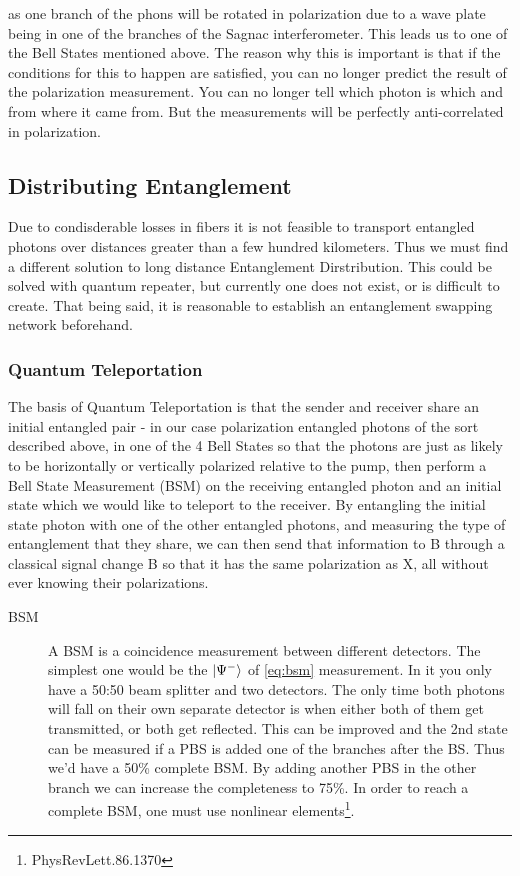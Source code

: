 \documentclass{article}
\theoremstyle{mytheoremstyle}
\theoremstyle{mytheoremstyle}
\theoremstyle{myproblemstyle}
\begin{document}
\par as one branch of the phons will be rotated in polarization due to a wave plate being in one of the branches of the Sagnac interferometer.
This leads us to one of the Bell States mentioned above.
The reason why this is important is that if the conditions for this to happen are satisfied, you can no longer 
predict the result of the polarization measurement. You can no longer tell which photon is which and from where it came from.
But the measurements will be perfectly anti-correlated in polarization. 

\subsection{Distributing Entanglement}
Due to condisderable losses in fibers it is not feasible to transport entangled photons over distances greater than a few hundred kilometers. Thus 
we must find a different solution to long distance Entanglement Dirstribution. This could be solved with quantum repeater, but currently one does not exist, 
or is difficult to create. That being said, it is reasonable to establish an entanglement swapping network beforehand.

\subsubsection{Quantum Teleportation}
The basis of Quantum Teleportation is that the sender and receiver share an initial entangled pair -
in our case polarization entangled photons of the sort described above, in one of the 4 Bell States
so that the photons are just as likely to be horizontally or vertically polarized relative to the pump,
then perform a Bell State Measurement (BSM) on the receiving entangled 
photon and an initial state which we would like to teleport to the receiver. 
By entangling the initial state photon with one of the other entangled photons, and measuring the type of entanglement that they
share, we can then send that information to B through a classical signal change B so that it has the same polarization as X,
all without ever knowing their polarizations.

\begin{description}
	\item[BSM] 
		A BSM is a coincidence measurement between different detectors. The simplest one would
		be the $\ket{\Psi^-}$ of \ref{eq:bsm} measurement. In it you only have a 50:50 beam splitter and two detectors. The only
		time both photons will fall on their own separate detector is when either both of them get transmitted,
		or both get reflected. This can be improved and the 2nd state can be measured if a PBS is added one 
		of the branches after the BS. Thus we'd have a 50\% complete BSM. By adding another PBS in the other 
		branch we can increase the completeness to 75\%. In order to reach a complete BSM, one must use nonlinear
		elements\footnote{PhysRevLett.86.1370}.
\end{description}
\end{document}
